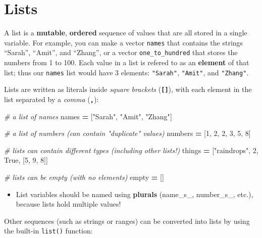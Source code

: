 \documentclass[]{book}
\newenvironment{Shaded}{\begin{snugshade}}{\end{snugshade}}
\newcommand{\DecValTok}[1]{\textcolor[rgb]{0.00,0.00,0.81}{#1}}
\newcommand{\StringTok}[1]{\textcolor[rgb]{0.31,0.60,0.02}{#1}}
\newcommand{\CommentTok}[1]{\textcolor[rgb]{0.56,0.35,0.01}{\textit{#1}}}
\newcommand{\VariableTok}[1]{\textcolor[rgb]{0.00,0.00,0.00}{#1}}
\newcommand{\OperatorTok}[1]{\textcolor[rgb]{0.81,0.36,0.00}{\textbf{#1}}}
\newcommand{\NormalTok}[1]{#1}
\providecommand{\tightlist}{%
  \setlength{\itemsep}{0pt}\setlength{\parskip}{0pt}}
\begin{document}
\hypertarget{lists}{\section{Lists}\label{lists}}

A list is a \textbf{mutable}, \textbf{ordered} sequence of values that
are all stored in a single variable. For example, you can make a vector
\texttt{names} that contains the strings ``Sarah'', ``Amit'', and
``Zhang'', or a vector \texttt{one\_to\_hundred} that stores the numbers
from 1 to 100. Each value in a list is refered to as an \textbf{element}
of that list; thus our \texttt{names} list would have 3 elements:
\texttt{"Sarah"}, \texttt{"Amit"}, and \texttt{"Zhang"}.

Lists are written as literals inside \emph{square brackets}
(\textbf{\texttt{{[}{]}}}), with each element in the list separated by a
\emph{comma} (\textbf{\texttt{,}}):

\begin{Shaded}
\begin{Highlighting}[]
\CommentTok{# a list of names}
\NormalTok{names }\OperatorTok{=}\NormalTok{ [}\StringTok{"Sarah"}\NormalTok{, }\StringTok{"Amit"}\NormalTok{, }\StringTok{"Zhang"}\NormalTok{]}

\CommentTok{# a list of numbers (can contain "duplicate" values)}
\NormalTok{numbers }\OperatorTok{=}\NormalTok{ [}\DecValTok{1}\NormalTok{, }\DecValTok{2}\NormalTok{, }\DecValTok{2}\NormalTok{, }\DecValTok{3}\NormalTok{, }\DecValTok{5}\NormalTok{, }\DecValTok{8}\NormalTok{]}

\CommentTok{# lists can contain different types (including other lists!)}
\NormalTok{things }\OperatorTok{=}\NormalTok{ [}\StringTok{"raindrops"}\NormalTok{, }\DecValTok{2}\NormalTok{, }\VariableTok{True}\NormalTok{, [}\DecValTok{5}\NormalTok{, }\DecValTok{9}\NormalTok{, }\DecValTok{8}\NormalTok{]]}

\CommentTok{# lists can be empty (with no elements)}
\NormalTok{empty }\OperatorTok{=}\NormalTok{ []}
\end{Highlighting}
\end{Shaded}

\begin{itemize}
\tightlist
\item
  List variables should be named using \textbf{plurals} (name\_s\_,
  number\_s\_, etc.), because lists hold multiple values!
\end{itemize}

Other sequences (such as strings or ranges) can be converted into lists
by using the built-in \texttt{list()} function:
\end{document}

